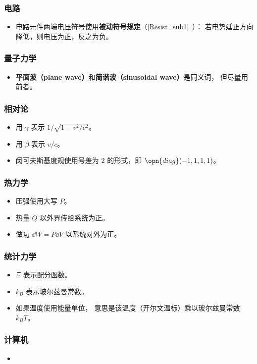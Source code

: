 \subsubsection{电路}
\begin{itemize}
\item 电路元件两端电压符号使用\textbf{被动符号规定}（\autoref{Resist_sub1}~）： 若电势延正方向降低，则电压为正，反之为负。
\end{itemize}

\subsubsection{量子力学}
\begin{itemize}
\item \textbf{平面波（plane wave）}和\textbf{简谐波（sinusoidal wave）}是同义词， 但尽量用前者。
\end{itemize}

\subsubsection{相对论}
\begin{itemize}
\item 用 $\gamma$ 表示 $1/\sqrt{1 - v^2/c^2}$。
\item 用 $\beta$ 表示 $v/c$。
\item 闵可夫斯基度规使用号差为 $2$ 的形式，即 $\opn{diag}(-1, 1, 1, 1)$。
\end{itemize}

\subsubsection{热力学}
\begin{itemize}
\item 压强使用大写 $P$。
\item 热量 $Q$ 以外界传给系统为正。
\item 做功 $\dd{W} = P\dd{V}$ 以系统对外为正。
\end{itemize}

\subsubsection{统计力学}
\begin{itemize}
\item $\Xi$ 表示配分函数。
\item $k_B$ 表示玻尔兹曼常数。
\item 如果温度使用能量单位， 意思是该温度（开尔文温标）乘以玻尔兹曼常数 $k_B T$。
\end{itemize}

\subsubsection{计算机}
\begin{itemize}
\item 
\end{itemize}
